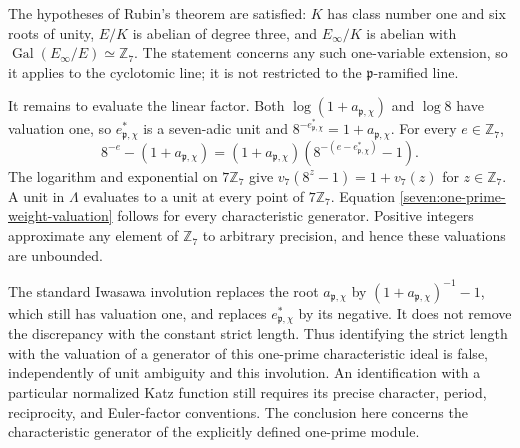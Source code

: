 The hypotheses of Rubin's theorem are satisfied: $K$ has class
number one and six roots of unity, $E/K$ is abelian of degree three,
and $E_\infty/K$ is abelian with
$\operatorname{Gal}(E_\infty/E)\simeq\mathbb Z_7$.
The statement concerns any such one-variable extension, so it
applies to the cyclotomic line; it is not restricted to the
$\mathfrak p$-ramified line.

It remains to evaluate the linear factor. Both
$\log(1+a_{\mathfrak p,\chi})$ and $\log8$ have valuation one, so
$e_{\mathfrak p,\chi}^{*}$ is a seven-adic unit and
$8^{-e_{\mathfrak p,\chi}^{*}}=1+a_{\mathfrak p,\chi}$.
For every $e\in\mathbb Z_7$,
\[
 8^{-e}-(1+a_{\mathfrak p,\chi})
 =(1+a_{\mathfrak p,\chi})
   \left(8^{-(e-e_{\mathfrak p,\chi}^{*})}-1\right).
\]
The logarithm and exponential on $7\mathbb Z_7$ give
$v_7(8^z-1)=1+v_7(z)$ for $z\in\mathbb Z_7$.
A unit in $\Lambda$ evaluates to a unit at every point of
$7\mathbb Z_7$. Equation
\eqref{seven:one-prime-weight-valuation} follows for every
characteristic generator.
Positive integers approximate any element of $\mathbb Z_7$ to
arbitrary precision, and hence these valuations are unbounded.

The standard Iwasawa involution replaces the root
$a_{\mathfrak p,\chi}$ by
$(1+a_{\mathfrak p,\chi})^{-1}-1$, which still has valuation one,
and replaces $e_{\mathfrak p,\chi}^{*}$ by its negative.
It does not remove the discrepancy with the constant strict length.
Thus identifying the strict length with the valuation of a generator
of this one-prime characteristic ideal is false, independently of
unit ambiguity and this involution.
An identification with a particular normalized Katz function still
requires its precise character, period, reciprocity, and Euler-factor
conventions. The conclusion here concerns the characteristic
generator of the explicitly defined one-prime module.

